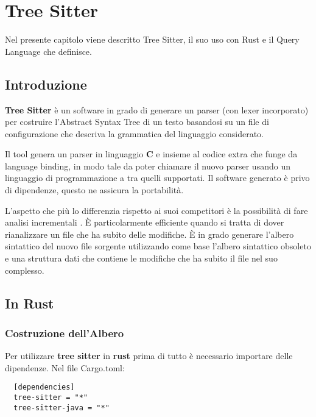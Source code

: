 \chapter{Tree Sitter}

Nel presente capitolo viene descritto Tree Sitter, il suo uso con Rust e il Query Language che definisce.

\section{Introduzione}

\textbf{Tree Sitter} \cite{TreeSitter} \`e un software in grado di generare un parser (con lexer incorporato) per costruire l'Abstract Syntax Tree di un testo basandosi su un file di configurazione che descriva la grammatica del linguaggio considerato.

Il tool \cite{TreeSitterCreatingParsers} genera un parser in linguaggio \textbf{C} e insieme al codice extra che funge da language binding, in modo tale da poter chiamare il nuovo parser usando un linguaggio di programmazione a tra quelli supportati.
Il software generato \`e privo di dipendenze, questo ne assicura la portabilit\`a.

L'aspetto che pi\`u lo differenzia rispetto ai suoi competitori \`e la possibilit\`a di fare analisi incrementali \cite{TreeSitterAdvancedParsing}.
\`E particolarmente efficiente quando si tratta di dover rianalizzare un file che ha subito delle modifiche.
\`E in grado generare l'albero sintattico del nuovo file sorgente utilizzando come base l'albero sintattico obsoleto e una struttura dati che contiene le modifiche che ha subito il file nel suo complesso.

\section{In Rust}

\subsection{Costruzione dell'Albero}

Per utilizzare \textbf{tree sitter} in \textbf{rust} \cite{TreeSitterCrate} prima di tutto \`e necessario importare delle dipendenze. Nel file Cargo.toml:

\begin{lstlisting}
  [dependencies]
  tree-sitter = "*"
  tree-sitter-java = "*"
\end{lstlisting}

